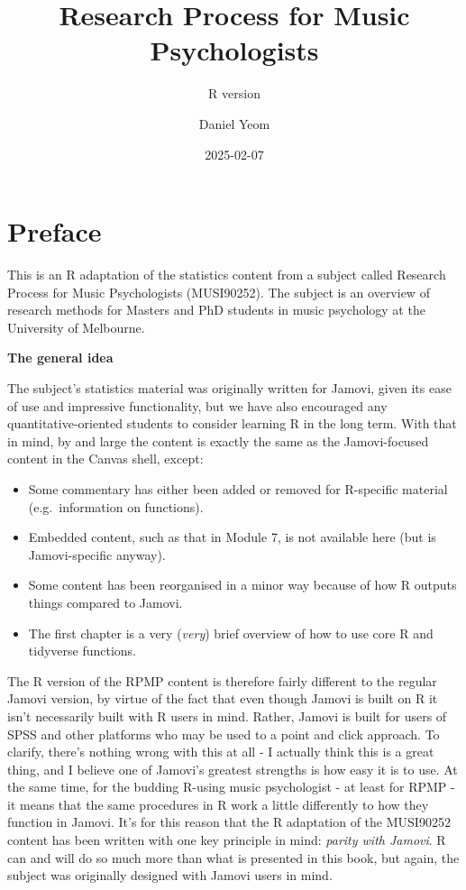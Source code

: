 \documentclass[
]{book}
\title{Research Process for Music Psychologists}
\subtitle{R version}
\author{Daniel Yeom}
\date{2025-02-07}
\providecommand{\tightlist}{%
  \setlength{\itemsep}{0pt}\setlength{\parskip}{0pt}}
\begin{document}
\maketitle

{
\setcounter{tocdepth}{1}
\tableofcontents
}
\chapter{Preface}\label{preface}

This is an R adaptation of the statistics content from a subject called Research Process for Music Psychologists (MUSI90252). The subject is an overview of research methods for Masters and PhD students in music psychology at the University of Melbourne.

\textbf{The general idea}

The subject's statistics material was originally written for Jamovi, given its ease of use and impressive functionality, but we have also encouraged any quantitative-oriented students to consider learning R in the long term. With that in mind, by and large the content is exactly the same as the Jamovi-focused content in the Canvas shell, except:

\begin{itemize}
\tightlist
\item
  Some commentary has either been added or removed for R-specific material (e.g.~information on functions).
\item
  Embedded content, such as that in Module 7, is not available here (but is Jamovi-specific anyway).
\item
  Some content has been reorganised in a minor way because of how R outputs things compared to Jamovi.
\item
  The first chapter is a very (\emph{very}) brief overview of how to use core R and tidyverse functions.
\end{itemize}

The R version of the RPMP content is therefore fairly different to the regular Jamovi version, by virtue of the fact that even though Jamovi is built on R it isn't necessarily built with R users in mind. Rather, Jamovi is built for users of SPSS and other platforms who may be used to a point and click approach. To clarify, there's nothing wrong with this at all - I actually think this is a great thing, and I believe one of Jamovi's greatest strengths is how easy it is to use. At the same time, for the budding R-using music psychologist - at least for RPMP - it means that the same procedures in R work a little differently to how they function in Jamovi. It's for this reason that the R adaptation of the MUSI90252 content has been written with one key principle in mind: \emph{parity with Jamovi}. R can and will do so much more than what is presented in this book, but again, the subject was originally designed with Jamovi users in mind.
\end{document}
